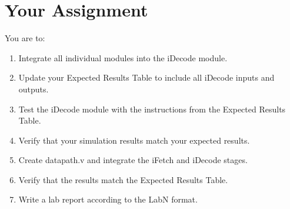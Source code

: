 \section{Your Assignment}

You are to:
\begin{enumerate}
\item Integrate all individual modules into the iDecode module.
\item Update your Expected Results Table to include all iDecode inputs and outputs.
\item Test the iDecode module with the instructions from the Expected Results Table.
\item Verify that your simulation results match your expected results.
\item Create datapath.v and integrate the iFetch and iDecode stages.
\item Verify that the results match the Expected Results Table.
\item Write a lab report according to the LabN format.
\end{enumerate} 